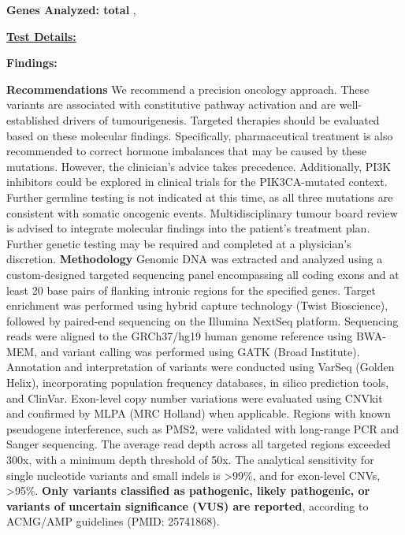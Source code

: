 \documentclass[11pt]{extarticle}
\newcommand{\data}[1]{}
\newenvironment{dataiter}[1]{}{}
\begin{document}
\vspace{3em}

{\bf \large Genes Analyzed: {\tiny \data{num_tested_genes} total}} \begin{dataiter}{tested_genes}\data{gene_symbol}, \end{dataiter}
\newpage

{\huge \bf \underline{Test Details:}} \newline
\newline

{\Large \bf Findings: }\newline
\data{blurb} \newline
\newline


{\Large \bf Recommendations \newline}
We recommend a precision oncology approach. These variants are associated with constitutive pathway activation and are well-established drivers of tumourigenesis. Targeted therapies should be evaluated based on these molecular findings. Specifically, pharmaceutical treatment is also recommended to correct hormone imbalances that may be caused by these mutations. However, the clinician's advice takes precedence. Additionally, PI3K inhibitors could be explored in clinical trials for the PIK3CA-mutated context. Further germline testing is not indicated at this time, as all three mutations are consistent with somatic oncogenic events. Multidisciplinary tumour board review is advised to integrate molecular findings into the patient's treatment plan. Further genetic testing may be required and completed at a physician's discretion. 
\newline 
\newline
{\Large \bf Methodology} \newline
Genomic DNA was extracted and analyzed using a custom-designed targeted sequencing panel encompassing all coding exons and at least 20 base pairs of flanking intronic regions for the specified genes. Target enrichment was performed using hybrid capture technology (Twist Bioscience), followed by paired-end sequencing on the Illumina NextSeq platform. Sequencing reads were aligned to the GRCh37/hg19 human genome reference using BWA-MEM, and variant calling was performed using GATK (Broad Institute). Annotation and interpretation of variants were conducted using VarSeq (Golden Helix), incorporating population frequency databases, in silico prediction tools, and ClinVar. Exon-level copy number variations were evaluated using CNVkit and confirmed by MLPA (MRC Holland) when applicable. Regions with known pseudogene interference, such as PMS2, were validated with long-range PCR and Sanger sequencing. The average read depth across all targeted regions exceeded 300x, with a minimum depth threshold of 50x. The analytical sensitivity for single nucleotide variants and small indels is >99\%, and for exon-level CNVs, >95\%. {\bf Only variants classified as pathogenic, likely pathogenic, or variants of uncertain significance (VUS) are reported}, according to ACMG/AMP guidelines (PMID: 25741868).
\end{document}
